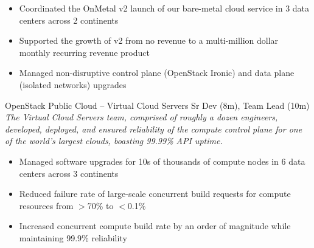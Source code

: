 \documentclass[margin,line]{resume}
\begin{document}
\begin{resume}
\begin{itemize}
\small\item Coordinated the OnMetal v2 launch of our bare-metal cloud service in 3 data centers across 2 continents
\small\item Supported the growth of v2 from no revenue to a multi-million dollar monthly recurring revenue product
\small\item Managed non-disruptive control plane (OpenStack Ironic) and data plane (isolated networks) upgrades
\end{itemize}\vspace{-\baselineskip} %
\vspace{4pt}
{\small OpenStack Public Cloud -- Virtual Cloud Servers  \hfill  Sr Dev (8m), Team Lead (10m)}\\
{\small\textit{The Virtual Cloud Servers team, comprised of roughly a dozen engineers, developed, deployed, and
ensured reliability of the compute control plane for one of the world's largest clouds, boasting 99.99\% API uptime.}}
\begin{itemize} \itemsep -2pt %
\small\item Managed software upgrades for 10s of thousands of compute nodes in 6 data centers across 3 continents
\small\item Reduced failure rate of large-scale concurrent build requests for compute resources from $>$70\% to $<$0.1\%
\small\item Increased concurrent compute build rate by an order of magnitude while maintaining 99.9\% reliability
\end{itemize}
\vspace{4pt}


\end{resume}
\end{document}
